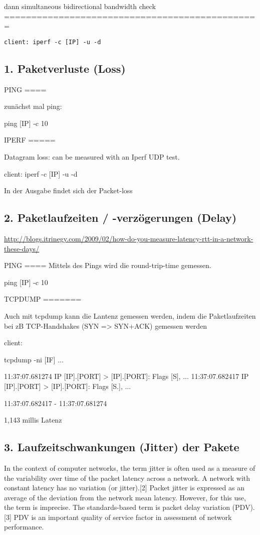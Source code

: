 \documentclass[a4paper,10pt]{article}
\begin{document}
dann simultaneous bidirectional bandwidth check
===============================================

\begin{lstlisting}
client: iperf -c [IP] -u -d
\end{lstlisting}

\subsection{1. Paketverluste (Loss)}

PING
====

zunächst mal ping:

ping [IP] -c 10

IPERF
=====

Datagram loss: can be measured with an Iperf UDP test.

client: iperf -c [IP] -u -d

In der Ausgabe findet sich der Packet-loss

\subsection{2. Paketlaufzeiten / -verzögerungen (Delay)}

\url{http://blogs.itrinegy.com/2009/02/how-do-you-measure-latency-rtt-in-a-network-these-days/}

PING
====
Mittels des Pings wird die round-trip-time gemessen.


ping [IP] -c 10

TCPDUMP
=======

Auch mit tcpdump kann die Lantenz gemessen werden, indem die Paketlaufzeiten bei zB TCP-Handshakes (SYN => SYN+ACK) gemessen werden

client:

tcpdump -ni [IF]
...

11:37:07.681274 IP [IP].[PORT] > [IP].[PORT]: Flags [S], ...
11:37:07.682417 IP [IP].[PORT] > [IP].[PORT]: Flags [S.], ...

11:37:07.682417 - 11:37:07.681274

1,143 millis Latenz

\subsection{3. Laufzeitschwankungen (Jitter) der Pakete}

In the context of computer networks, the term jitter is often used as a measure of the variability over time of the packet latency across a network. A network with constant latency has no variation (or jitter).[2] Packet jitter is expressed as an average of the deviation from the network mean latency. However, for this use, the term is imprecise. The standards-based term is packet delay variation (PDV).[3] PDV is an important quality of service factor in assessment of network performance.
\end{document}
